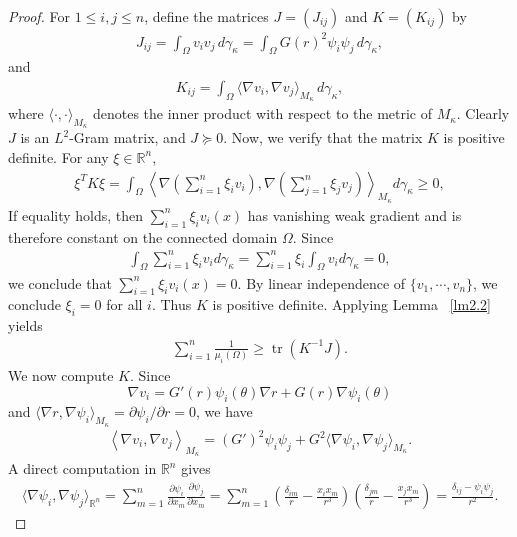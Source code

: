 \documentclass[11pt,leqno]{amsart}
\def\k{\kappa}
\def\p{\partial}
\def\R{\mathbb{R}}
\def\k{\kappa}
\def \p {\partial}
\def\tr{\operatorname{tr}}
\def\tr{\operatorname{tr}}
\numberwithin{equation}{section}
\begin{document}
\begin{proof}
For $1\leq i, j\leq n$, define the matrices $J=(J_{ij})$ and $K=(K_{ij})$ by
\begin{align*}
            J_{ij}=\int_\Omega v_iv_j\,d\gamma_{\k}=\int_\Omega G(r)^2\psi_i\psi_j\,d\gamma_{\k},
\end{align*}
and
\begin{align*}
        K_{ij}=\int_\Omega \langle \nabla v_i,\nabla v_j\rangle_{M_\k}\,d\gamma_{\k},
\end{align*}
where   $\langle \cdot, \cdot\rangle_{M_{\k}}$  denotes the inner product with respect to the metric of $M_\k$. Clearly $J$ is an $L^2$-Gram matrix, and $J\succeq 0$.
Now, we  verify that the matrix $K$ is positive definite. For any $\xi\in \mathbb{R}^{n}$,
\begin{align*}
    \xi^{T}K\xi=\int_{\Omega}\left\langle \nabla (\sum_{i=1}^{n}\xi_{i}v_{i}),\nabla(\sum_{j=1}^{n}\xi_{j}v_{j})\right\rangle_{M_\k} d\gamma_{\k}\geq 0,
\end{align*}
If equality holds, then 
 $\sum_{i=1}^{n}\xi_{i}v_{i}(x)$
 has vanishing  weak gradient and  is therefore constant on the connected domain $\Omega$. 
Since
 \begin{align*}     \int_{\Omega}\sum_{i=1}^{n}\xi_{i}v_{i}d\gamma_{\k}=\sum_{i=1}^{n}\xi_{i}\int_{\Omega}v_{i}d\gamma_{\k}=0,
 \end{align*} 
we conclude that $\sum_{i=1}^{n}\xi_{i}v_{i}(x)=0$. By linear independence of $\{v_{1},\cdots, v_{n}\}$, we conclude $\xi_{i}=0$ for all $i$. Thus $K$ is  positive definite.
Applying Lemma ~\ref{lm2.2} yields 
\begin{align}\label{4.2}
    \sum_{i=1}^{n}\frac{1}{\mu_{i}(\Omega)}\geq \tr(K^{-1}J).
\end{align}
We now compute $K$. Since
$$
\nabla v_i=G'(r)\psi_i(\theta)\nabla r+G(r)\nabla \psi_i(\theta)
$$
and $\langle \nabla r,\nabla\psi_i\rangle_{M_\k} =\p \psi_i/\p r=0$, we have
\begin{align*}
    \left\langle \nabla v_{i},\nabla v_{j}\right\rangle_{M_\k}
    =(G')^{2}\psi_i\psi_j+G^{2}\langle \nabla \psi_i,\nabla \psi_j\rangle_{M_\k}.
\end{align*}
A direct computation in $\R^n$ gives
\begin{align*}
    \langle \nabla \psi_i,\nabla \psi_j\rangle_{{\R^{n}}}
    =\sum_{m=1}^{n}\frac{\partial \psi_i}{\partial x_{m}}\frac{\partial \psi_j}{\partial x_m}
    =\sum_{m=1}^{n}(\frac{\delta_{im}}{r}-\frac{x_{i}x_{m}}{r^{3}})(\frac{\delta_{jm}}{r}-\frac{x_{j}x_{m}}{r^{3}})
    =\frac{\delta_{ij}-\psi_i\psi_j}{r^{2}}.
\end{align*}

\end{proof}
\end{document}
